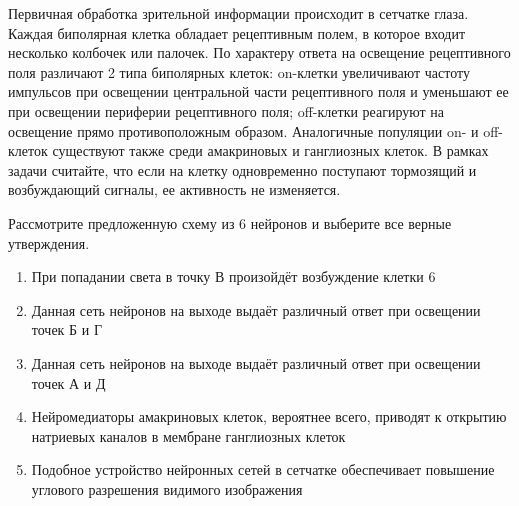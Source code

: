 
Первичная обработка зрительной информации происходит в
сетчатке глаза. Каждая биполярная клетка обладает рецептивным полем, в которое
входит несколько колбочек или палочек. По характеру ответа на освещение
рецептивного поля различают 2 типа биполярных клеток: on-клетки увеличивают частоту импульсов при освещении центральной
части рецептивного поля и уменьшают ее при освещении периферии рецептивного
поля; off-клетки реагируют на
освещение прямо противоположным образом. Аналогичные популяции on- и off-клеток
существуют также среди амакриновых и ганглиозных клеток. В рамках задачи
считайте, что если на клетку одновременно поступают тормозящий и возбуждающий
сигналы, ее активность не изменяется.


Рассмотрите предложенную схему из 6 нейронов и
выберите все верные утверждения.

\begin{enumerate}
    \item При попадании света в точку В произойдёт возбуждение клетки 6
    \item Данная сеть нейронов на выходе выдаёт различный ответ при освещении точек Б и Г
    \item Данная сеть нейронов на выходе выдаёт различный ответ при освещении точек А и Д
    \item Нейромедиаторы амакриновых клеток, вероятнее всего, приводят к открытию натриевых каналов в мембране ганглиозных клеток
    \item Подобное устройство нейронных сетей в сетчатке обеспечивает повышение углового разрешения видимого изображения
\end{enumerate}



